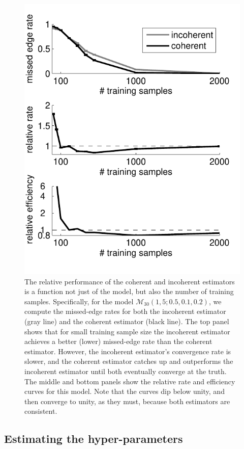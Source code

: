 \documentclass[10pt,journal,cspaper,compsoc]{IEEEtran}
\providecommand{\mc}[1]{\mathcal{#1}}
\begin{document}
\begin{figure}[htbp]
	\centering
		\includegraphics[width=0.8\linewidth]{../figs/RE_V30_s5_p10_q20.pdf}
	\caption{The relative performance of the coherent and incoherent estimators is a function not just of the model, but also the number of training samples.  Specifically, for the model $\mc{M}_{30}(1,5;0.5,0.1,0.2)$, we compute the missed-edge rates for both the incoherent estimator (gray line) and the coherent estimator (black line).  The top panel shows that for small training sample size the incoherent estimator achieves a better (lower) missed-edge rate than the coherent estimator. However, the incoherent estimator's convergence rate is slower, and the coherent estimator catches up and outperforms the incoherent estimator until both eventually converge at the truth.  The middle and bottom panels show the relative rate and efficiency curves for this model. Note that the curves dip below unity, and then converge to unity, as they must, because both estimators are consistent. }
	\label{fig:RE}
\end{figure}


\subsection{Estimating the hyper-parameters} %
\label{sub:estimating_the_hyper_parameters}
\end{document}
